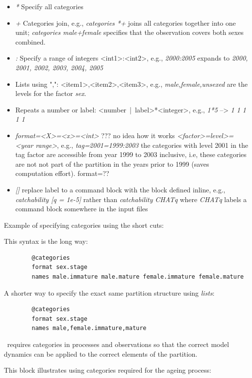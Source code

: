 \begin{itemize}
	\item \textit{*} Specify all categories
	\item \textit{+} Categories join, e.g., \textit{categories *+} joins all categories together into one unit; \textit{categories male+female}
specifies that the observation covers both sexes combined.
    \item \textit{:} Specify a range of integers <int1>:<int2>, e.g., \textit{2000:2005} expands to \textit{2000, 2001, 2002, 2003, 2004, 2005}
    \item Lists using ",": <item1>,<item2>,<item3>, e.g., \textit{male,female,unsexed} are the levels for the factor \textit{sex}.
    \item Repeats a number or label: <number~|~label>*<integer>, e.g., \textit{1*5} --> \textit{1 1 1 1 1} 
    \item \textit{format=<X>=<x>=<int>}   ??? no idea how it works
    \textit{<factor>=level>=<year range>}, e.g., \textit{tag=2001=1999:2003} the categories with level 2001 in the tag factor are accessible from year 1999 to 2003 inclusive, i.e, these categories are not not part of the partition in the years prior to 1999 (saves computation effort). format=??
    \item \textit{[]} replace label to a command block with the block defined inline, e.g., \textit{catchability [q = 1e-5]} rather than \textit{catchability CHATq} where \textit{CHATq} labels a command block somewhere in the input files
\end{itemize}


Example of specifying categories using the short cuts:

This syntax is the long way:
{\small{\begin{verbatim}
		@categories
		format sex.stage
		names male.immature male.mature female.immature female.mature
\end{verbatim}}}

A shorter way to specify the exact same partition structure  using \textit{lists}:

{\small{\begin{verbatim}
		@categories
		format sex.stage
		names male,female.immature,mature
\end{verbatim}}}

\CNAME\ requires categories in processes and observations so that the correct model dynamics can be applied to the correct elements of the partition.

This block illustrates using categories required for the ageing process:

